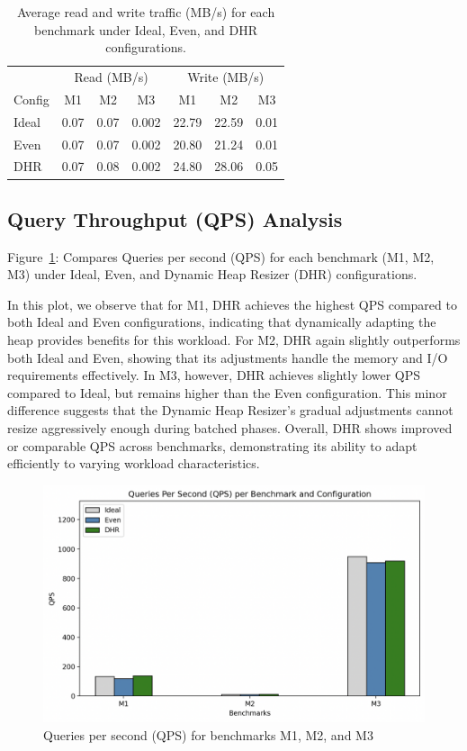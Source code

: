 \begin{table}[h]
\centering
\caption{Average read and write traffic (MB/s) for each benchmark under Ideal, Even, and DHR configurations.}
\label{tab:traffic}
\begin{tabular}{l|ccc|ccc}
\hline
 & \multicolumn{3}{c|}{Read (MB/s)} & \multicolumn{3}{c}{Write (MB/s)} \\
Config & M1 & M2 & M3 & M1 & M2 & M3 \\
\hline
Ideal & 0.07 & 0.07 & 0.002 & 22.79 & 22.59 & 0.01 \\
Even  & 0.07 & 0.07 & 0.002 & 20.80 & 21.24 & 0.01 \\
DHR   & 0.07 & 0.08 & 0.002 & 24.80 & 28.06 & 0.05 \\
\hline
\end{tabular}
\end{table}

\subsection{Query Throughput (QPS) Analysis}

Figure~\ref{fig:qps_plot}: Compares Queries per second (QPS) for each benchmark (M1, M2, M3)
under Ideal, Even, and Dynamic Heap Resizer (DHR) configurations.

In this plot, we observe that for M1, DHR achieves the highest QPS compared to both 
Ideal and Even configurations, indicating that dynamically adapting the heap provides
benefits for this workload. For M2, DHR again slightly outperforms both Ideal and Even, 
showing that its adjustments handle the memory and I/O requirements effectively. In M3,
however, DHR achieves slightly lower QPS compared to Ideal, but remains higher than the
Even configuration. This minor difference suggests that the Dynamic Heap Resizer’s gradual 
adjustments cannot resize aggressively enough during batched phases.
Overall, DHR shows improved or comparable QPS across benchmarks, demonstrating its ability 
to adapt efficiently to varying workload characteristics.

\begin{figure}[htbp]
  \centering
  \includegraphics[width=1\columnwidth]{fig/qps_plot.png}
  \caption{Queries per second (QPS) for benchmarks M1, M2, and M3}
  \label{fig:qps_plot}
\end{figure}

